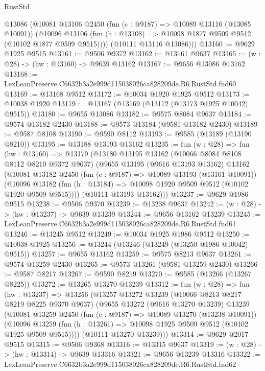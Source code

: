 \begin{lexlean}{RustStd}
\begin{coremodule}
        @13086
        (@10081
          @13106
          @2450
          (fun (c : @9187) => @10089 @13116 (@13085 @10091))
          (@10096 @13106 (fun (h : @13108) => @10098 @1877 @9509 @9512 (@10102 @1877 @9509 @9515))))
        (@10111 @13116 @13086)))
@13160 := @9629 @1925 @9515
@13161 := @9506 @9372
@13162 := @13161 @9637
@13165 := (w : @28) -> (hw : @13160) -> @9639 @13162
@13167 := @9656 @13086 @13162
@13168 := LexLeanPreserve.C6632b3a2e999d115038026ca828209de.R6.RustStd.fnd60
@13169 := @13168 @9512
@13172 := @10034 @1920 @1925 @9512
@13173 := @10038 @1920
@13179 := @13167 (@13169 (@13172 (@13173 @1925 @10042) @9515))
@13180 := @9655 @13086
@13182 := @9575 @8084 @9637
@13184 := @9574 @13182 @2430
@13188 := @9573 @13184 (@9581 @13182 @2430)
@13189 := @9587 @8108
@13190 := @9590 @8112
@13193 := @9585 (@13189 (@13190 @8210))
@13195 := @13188 @13193 @13162
@13235 := fun (w : @28) =>
  fun (hw : @13160) =>
  @13179
    (@13180
      @13195
      @13162
      (@10066 @8084 @8108 @8112 @8210 @9372 @9637)
      (@9655
        @13195
        (@9616 @13193 @13162)
        @13162
        (@10081
          @13182
          @2450
          (fun (c : @9187) => @10089 @13193 (@13161 @10091))
          (@10096 @13182 (fun (h : @13184) => @10098 @1920 @9509 @9512 (@10102 @1920 @9509 @9515))))
        (@10111 @13193 @13162)))
@13237 := @9629 @1986 @9515
@13238 := @9506 @9370
@13239 := @13238 @9637
@13242 := (w : @28) -> (hw : @13237) -> @9639 @13239
@13244 := @9656 @13162 @13239
@13245 := LexLeanPreserve.C6632b3a2e999d115038026ca828209de.R6.RustStd.fnd61
@13246 := @13245 @9512
@13249 := @10034 @1925 @1986 @9512
@13250 := @10038 @1925
@13256 := @13244 (@13246 (@13249 (@13250 @1986 @10042) @9515))
@13257 := @9655 @13162
@13259 := @9575 @8213 @9637
@13261 := @9574 @13259 @2430
@13265 := @9573 @13261 (@9581 @13259 @2430)
@13266 := @9587 @8217
@13267 := @9590 @8219
@13270 := @9585 (@13266 (@13267 @8225))
@13272 := @13265 @13270 @13239
@13312 := fun (w : @28) =>
  fun (hw : @13237) =>
  @13256
    (@13257
      @13272
      @13239
      (@10066 @8213 @8217 @8219 @8225 @9370 @9637)
      (@9655
        @13272
        (@9616 @13270 @13239)
        @13239
        (@10081
          @13259
          @2450
          (fun (c : @9187) => @10089 @13270 (@13238 @10091))
          (@10096 @13259 (fun (h : @13261) => @10098 @1925 @9509 @9512 (@10102 @1925 @9509 @9515))))
        (@10111 @13270 @13239)))
@13314 := @9629 @2017 @9515
@13315 := @9506 @9368
@13316 := @13315 @9637
@13319 := (w : @28) -> (hw : @13314) -> @9639 @13316
@13321 := @9656 @13239 @13316
@13322 := LexLeanPreserve.C6632b3a2e999d115038026ca828209de.R6.RustStd.fnd62

\end{coremodule}
\end{lexlean}
